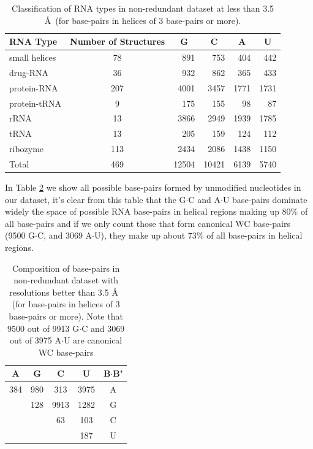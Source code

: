 \begin{table}[htbp]
\begin{center}
\begin{tabular}{|l|c|r|r|r|r|}
\hline
RNA Type & \multicolumn{1}{p{2cm}|}{Number of Structures} & \multicolumn{1}{c|}{G} &
\multicolumn{1}{c|}{C} & \multicolumn{1}{c|}{A} &
\multicolumn{1}{c|}{U} \\ \hline \hline
small helices & 78 & 891 & 753 & 404 & 442 \\ \hline
drug-RNA & 36 & 932 & 862 & 365 & 433 \\ \hline
protein-RNA & 207 & 4001 & 3457 & 1771 & 1731 \\ \hline
protein-tRNA & 9 & 175 & 155 & 98 & 87 \\ \hline
rRNA & 13 & 3866 & 2949 & 1939 & 1785 \\ \hline
tRNA & 13 & 205 & 159 & 124 & 112 \\ \hline
ribozyme & 113 & 2434 & 2086 & 1438 & 1150 \\ \hline
Total & 469 & \multicolumn{1}{c|}{12504} & \multicolumn{1}{c|}{10421} & \multicolumn{1}{c|}{6139} & \multicolumn{1}{c|}{5740} \\ \hline
\end{tabular}
\caption{Classification of RNA types in non-redundant dataset at less
  than 3.5 \AA~(for base-pairs in helices of 3 base-pairs or more).}
\label{tab:dbase}
\end{center}
\end{table}

In Table  \ref{tab:bpcomp} we show  all possible base-pairs  formed by
unmodified nucleotides in our dataset,  it's clear from this table that
the G$\cdot$C  and A$\cdot$U base-pairs  dominate widely the  space of
possible  RNA base-pairs  in helical  regions  making up  80\% of  all
base-pairs  and  if  we  only  count those  that  form  canonical  WC
base-pairs (9500  G$\cdot$C, and 3069  A$\cdot$U), they make  up about
73\% of all base-pairs in helical regions.

\begin{table}[htbp]
\begin{center}
\begin{tabular}{|c|c|c|c|c|}
\hline
A    &      G    &      C    &      U    &      B$\cdot$B' \\ \hline \hline
384  &    980    &    313    &   3975    &      A  \\ \hline
     &    128    &   9913    &   1282    &      G  \\ \hline
     &           &     63    &    103    &      C  \\ \hline
     &           &           &    187    &      U  \\ \hline
\end{tabular}
\caption{Composition  of  base-pairs  in  non-redundant  dataset  with
  resolutions better  than 3.5  \AA~ (for base-pairs  in helices  of 3
  base-pairs or more).  Note that 9500 out of  9913 G$\cdot$C and 3069
  out of 3975 A$\cdot$U are canonical WC base-pairs}
\label{tab:bpcomp}
\end{center}
\end{table}

